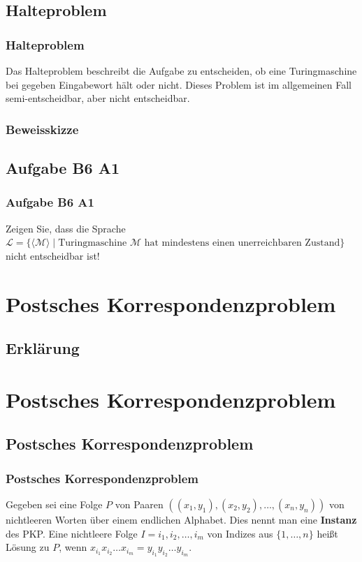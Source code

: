 \subsection{Halteproblem}
\begin{frame}
	\frametitle{Halteproblem}
	Das Halteproblem beschreibt die Aufgabe zu entscheiden, ob eine Turingmaschine bei gegeben Eingabewort hält oder nicht. Dieses Problem ist im allgemeinen Fall semi-entscheidbar, aber nicht entscheidbar.
\end{frame}
\begin{frame}
	\frametitle{Beweisskizze}
	
\end{frame}
\subsection{Aufgabe B6 A1}
\begin{frame}
	\frametitle{Aufgabe B6 A1}
	Zeigen Sie, dass die Sprache \\ $\mathcal{L} = \{\langle\mathcal{M}\rangle \; | \; \mbox{Turingmaschine $\mathcal{M}$ hat mindestens einen unerreichbaren Zustand}\}$ \\ nicht entscheidbar ist!
\end{frame}

\section{Postsches Korrespondenzproblem}
\subsection{Erklärung}
\section{Postsches Korrespondenzproblem}
\subsection{Postsches Korrespondenzproblem}
\begin{frame}
\frametitle{Postsches Korrespondenzproblem}
Gegeben sei eine Folge $P$ von Paaren $((x_1, y_1), (x_2, y_2), \ldots, (x_n,y_n))$ von nichtleeren Worten über einem endlichen Alphabet. Dies nennt man eine \textbf{Instanz} des PKP.
Eine nichtleere Folge $I = i_1, i_2, \ldots, i_m$ von Indizes aus $\{1, \ldots, n\}$ heißt Lösung zu $P$, wenn $x_{i_1}x_{i_2}\ldots{}x_{i_m} = y_{i_1}y_{i_2}\ldots{}y_{i_m}$.
\end{frame}

